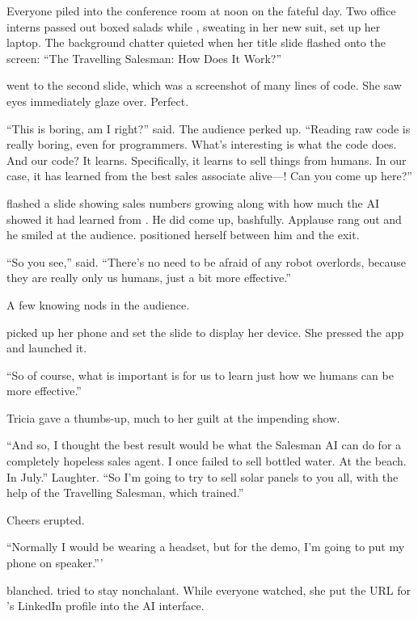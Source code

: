 Everyone piled into the conference room at noon on the fateful day. Two office interns passed out boxed salads while {\protag}, sweating in her new suit, set up her laptop. The background chatter quieted when her title slide flashed onto the screen: ``The Travelling Salesman: How Does It Work?''

{\protag} went to the second slide, which was a screenshot of many lines of code. She saw eyes immediately glaze over. Perfect.

``This is boring, am I right?'' {\protag} said. The audience perked up. ``Reading raw code is really boring, even for programmers. What's interesting is what the code does. And our code? It learns. Specifically, it learns to sell things from humans. In our case, it has learned from the best sales associate alive---{\energyJerk}! Can you come up here?''

{\protag} flashed a slide showing sales numbers growing along with how much the AI showed it had learned from {\energyJerk}. He did come up, bashfully. Applause rang out and he smiled at the audience. {\protag} positioned herself between him and the exit.

``So you see,'' {\protag} said. ``There's no need to be afraid of any robot overlords, because they are really only us humans, just a bit more effective.''

A few knowing nods in the audience.

{\protag} picked up her phone and set the slide to display her device. She pressed the app and launched it.

``So of course, what is important is for us to learn just how we humans can be more effective.''

Tricia gave {\protag} a thumbs-up, much to her guilt at the impending show.

``And so, I thought the best result would be what the Salesman AI can do for a completely hopeless sales agent. I once failed to sell bottled water. At the beach. In July.'' Laughter. ``So I'm going to try to sell solar panels to you all, with the help of the Travelling Salesman, which {\energyJerk} trained.''

Cheers erupted.

``Normally I would be wearing a headset, but for the demo, I'm going to put my phone on speaker.'''

{\energyJerk} blanched. {\protag} tried to stay nonchalant. While everyone watched, she put the URL for {\energyJerk}'s LinkedIn profile into the AI interface.

